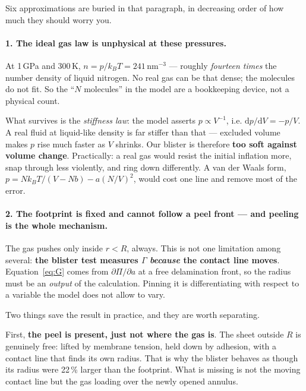 \documentclass[11pt,a4paper]{article}
\begin{document}
Six approximations are buried in that paragraph, in decreasing order of how much
they should worry you.

\paragraph{1. The ideal gas law is unphysical at these pressures.} At 1\,GPa and
300\,K, $n = p/k_BT = 241\,\mathrm{nm^{-3}}$ --- roughly \emph{fourteen times}
the number density of liquid nitrogen. No real gas can be that dense; the
molecules do not fit. So the ``$N$ molecules'' in the model are a bookkeeping
device, not a physical count.

What survives is the \emph{stiffness law}: the model asserts
$p \propto V^{-1}$, i.e. $\mathrm{d}p/\mathrm{d}V = -p/V$. A real fluid at
liquid-like density is far stiffer than that --- excluded volume makes $p$ rise
much faster as $V$ shrinks. Our blister is therefore \textbf{too soft against
volume change}. Practically: a real gas would resist the initial inflation more,
snap through less violently, and ring down differently. A van der Waals form,
$p = Nk_BT/(V-Nb) - a(N/V)^2$, would cost one line and remove most of the error.

\paragraph{2. The footprint is fixed and cannot follow a peel front --- and
peeling is the whole mechanism.} The gas pushes only inside $r < R$, always. This
is not one limitation among several: \textbf{the blister test measures $\Gamma$
\emph{because} the contact line moves}. Equation~\eqref{eq:G} comes from
$\partial \Pi/\partial a$ at a free delamination front, so the radius must be an
\emph{output} of the calculation. Pinning it is differentiating with respect to a
variable the model does not allow to vary.

Two things save the result in practice, and they are worth separating.

First, \textbf{the peel is present, just not where the gas is}. The sheet outside
$R$ is genuinely free: lifted by membrane tension, held down by adhesion, with a
contact line that finds its own radius. That is why the blister behaves as though
its radius were 22\,\% larger than the footprint. What is missing is not the
moving contact line but the gas loading over the newly opened annulus.
\end{document}
